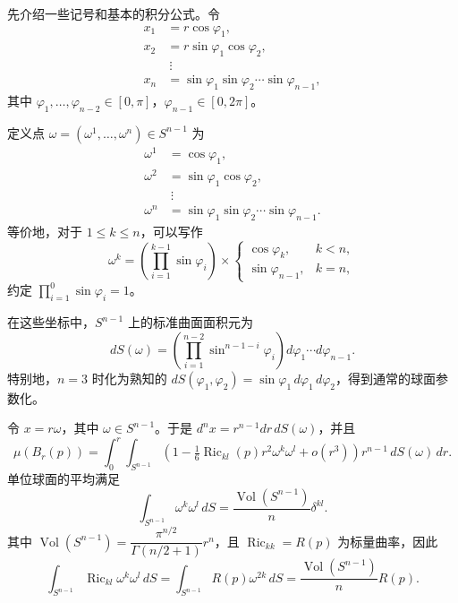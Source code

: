 
先介绍一些记号和基本的积分公式。令
\[
  \begin{aligned}
   x_1&=r\cos\varphi_1,\\
   x_2&=r\sin\varphi_1\cos\varphi_2,\\
     &\ \vdots\\
   x_n&=\sin\varphi_1\sin\varphi_2\cdots\sin\varphi_{n-1},
  \end{aligned}
\]
其中 $\varphi_1,\ldots,\varphi_{n-2}\in[0,\pi]$，$\varphi_{n-1}\in[0,2\pi]$。

定义点 $\omega=(\omega^1,\ldots,\omega^n)\in S^{n-1}$ 为
\[
  \begin{aligned}
   \omega^1&=\cos\varphi_1,\\
   \omega^2&=\sin\varphi_1\cos\varphi_2,\\
          &\ \vdots\\
   \omega^n&=\sin\varphi_1\sin\varphi_2\cdots\sin\varphi_{n-1}.
  \end{aligned}
\]
等价地，对于 $1\leq k\leq n$，可以写作
\[
  \omega^k=\left(\prod_{i=1}^{k-1}\sin\varphi_i\right)
  \times\begin{cases}
     \cos\varphi_k,&k<n,\\
     \sin\varphi_{n-1},&k=n,
  \end{cases}
\]
约定 $\prod_{i=1}^0\sin\varphi_i=1$。

在这些坐标中，$S^{n-1}$ 上的标准曲面面积元为
\[
  dS(\omega)=\left(\prod_{i=1}^{n-2}\sin^{n-1-i}\varphi_i\right)
             d\varphi_1\cdots d\varphi_{n-1}.
\]
特别地，$n=3$ 时化为熟知的 $dS(\varphi_1,\varphi_2)=\sin\varphi_1\,d\varphi_1\,d\varphi_2$，得到通常的球面参数化。

令 $x=r\omega$，其中 $\omega\in S^{n-1}$。于是 $d^nx=r^{n-1}dr\,dS(\omega)$，并且
\begin{equation*}
  \mu(B_r(p))=\int_0^r\int_{S^{n-1}}
     \left(1-\tfrac16\operatorname{Ric}_{kl}(p)r^2\omega^k\omega^l+o(r^3)\right)
      r^{n-1}\,dS(\omega)\,dr.
  \tag{6F4}\label{eq:6F4}
\end{equation*}
单位球面的平均满足
\[
  \int_{S^{n-1}}\omega^k\omega^l\,dS
  =\frac{\operatorname{Vol}(S^{n-1})}{n}\delta^{kl}.
\]
其中 $\operatorname{Vol}(S^{n-1})=\dfrac{\pi^{n/2}}{\Gamma(n/2+1)}r^n$，且 $\operatorname{Ric}_{kk}=R(p)$ 为标量曲率，因此
\begin{equation*}
  \int_{S^{n-1}}\operatorname{Ric}_{kl}\omega^k\omega^l\,dS
   =\int_{S^{n-1}}R(p)\omega^{2k}\,dS
   =\frac{\operatorname{Vol}(S^{n-1})}{n}R(p).
  \tag{6F5}\label{eq:6F5}
\end{equation*}

